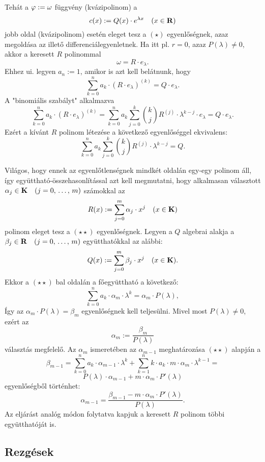 Tehát  a $\varphi := \omega$ függvény (kvázipolinom) a
\[
	 c(x) := Q(x) \cdot e^{\lambda x} \quad (x \in \mathbf{R})
\]
jobb oldal (kvázipolinom) esetén eleget tesz a $(\star)$ egyenlőségnek, azaz megoldása az illető differenciálegyenletnek. Ha itt pl. $r=0$, azaz $P(\lambda) \neq 0$, akkor a keresett $R$ polinommal
\[
	\omega = R \cdot e_\lambda.
\]
Ehhez ui. legyen $a_n := 1$, amikor is azt kell belátnunk, hogy
\[
	\sum_{k=0}^n a_k \cdot (R \cdot e_\lambda)^{(k)} = Q \cdot e_\lambda.
\]
A "binomiális szabályt" alkalmazva
\[
	\sum_{k=0}^n a_k \cdot (R \cdot e_\lambda)^{(k)} = \sum_{k=0}^n a_k \sum_{j=0}^k \binom{k}{j} R^{(j)} \cdot \lambda^{k-j} \cdot e_\lambda = Q \cdot e_\lambda.
\]
Ezért a kívánt $R$ polinom létezése a következő egyenlőséggel ekvivalens:
\begin{equation}
	\sum_{k=0}^n a_k \sum_{j=0}^k \binom{k}{j} R^{(j)} \cdot \lambda^{k-j} = Q.
	\tag{$\star \star$}
\end{equation}

Világos, hogy ennek az egyenlőtlenségnek mindkét oldalán egy-egy polinom áll, így együttható-összehasonlítással azt kell megmutatni, hogy alkalmasan választott $\alpha_j \in \mathbf{K} \quad (j = 0, \, \dots, \, m)$ számokkal az
\[
	R(x) := \sum_{j=0}^m \alpha_j \cdot x^j \quad (x \in \mathbf{K})
\]
polinom eleget tesz a $(\star \star)$ egyenlőségnek. Legyen a $Q$ algebrai alakja a $\beta_j \in \mathbf{R} \quad (j = 0, \, \dots, \, m)$ együtthatókkal az alábbi:
\[
	Q(x) := \sum_{j=0}^m \beta_j \cdot x^j \quad (x \in \mathbf{K}).
\]
Ekkor a $(\star \star)$ bal oldalán a főegyüttható a következő:
\[
	\sum_{k=0}^n a_k \cdot \alpha_m \cdot \lambda^k = \alpha_m \cdot P(\lambda),
\]
Így az $\alpha_m \cdot P(\lambda) = \beta_m$ egyenlőségnek kell teljesülni. Mivel most $P(\lambda) \neq 0$, ezért az
\[
	\alpha_m := \frac{\beta_m}{P(\lambda)}
\]
választás megfelelő. Az $\alpha_m$ ismeretében az $\alpha_{m-1}$ meghatározása $(\star \star)$ alapján a
\[
	\beta_{m-1} = \sum_{k=0}^n a_k \cdot \alpha_{m-1} \cdot \lambda^k + \sum_{k=1}^n k \cdot a_k \cdot m \cdot \alpha_m \cdot \lambda^{k-1} =
\]
\[
	P(\lambda) \cdot \alpha_{m-1} + m \cdot \alpha_m \cdot P'(\lambda)
\]
egyenlőségből történhet:
\[
	\alpha_{m-1} = \frac{\beta_{m-1} - m \cdot \alpha_m \cdot P'(\lambda)}{P(\lambda)}.
\]
Az eljárást analóg módon folytatva kapjuk a keresett $R$ polinom többi együtthatóját is.  

\subsection{Rezgések}


